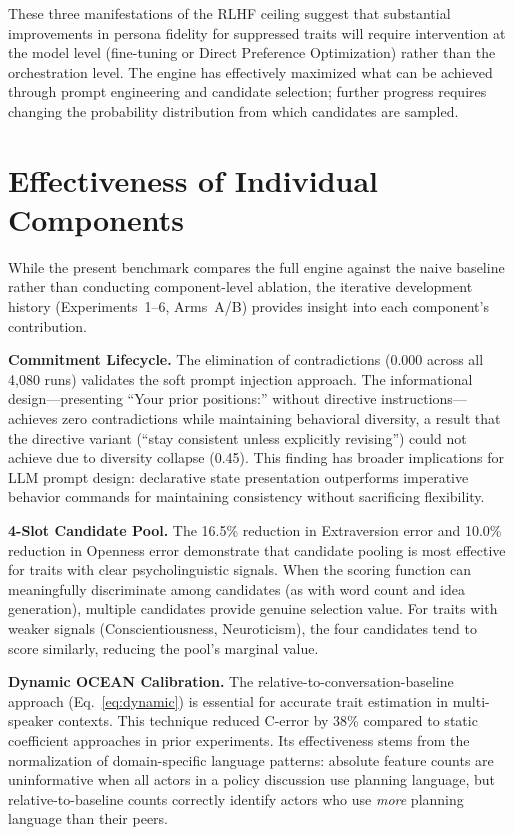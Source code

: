 These three manifestations of the RLHF ceiling suggest that substantial improvements in persona fidelity for suppressed traits will require intervention at the model level (fine-tuning or Direct Preference Optimization) rather than the orchestration level. The engine has effectively maximized what can be achieved through prompt engineering and candidate selection; further progress requires changing the probability distribution from which candidates are sampled.


\section{Effectiveness of Individual Components}

While the present benchmark compares the full engine against the naive baseline rather than conducting component-level ablation, the iterative development history (Experiments~1--6, Arms~A/B) provides insight into each component's contribution.

\textbf{Commitment Lifecycle.} The elimination of contradictions (0.000 across all 4,080 runs) validates the soft prompt injection approach. The informational design---presenting ``Your prior positions:'' without directive instructions---achieves zero contradictions while maintaining behavioral diversity, a result that the directive variant (``stay consistent unless explicitly revising'') could not achieve due to diversity collapse (0.45). This finding has broader implications for LLM prompt design: declarative state presentation outperforms imperative behavior commands for maintaining consistency without sacrificing flexibility.

\textbf{4-Slot Candidate Pool.} The 16.5\% reduction in Extraversion error and 10.0\% reduction in Openness error demonstrate that candidate pooling is most effective for traits with clear psycholinguistic signals. When the scoring function can meaningfully discriminate among candidates (as with word count and idea generation), multiple candidates provide genuine selection value. For traits with weaker signals (Conscientiousness, Neuroticism), the four candidates tend to score similarly, reducing the pool's marginal value.

\textbf{Dynamic OCEAN Calibration.} The relative-to-conversation-baseline approach (Eq.~\ref{eq:dynamic}) is essential for accurate trait estimation in multi-speaker contexts. This technique reduced C-error by 38\% compared to static coefficient approaches in prior experiments. Its effectiveness stems from the normalization of domain-specific language patterns: absolute feature counts are uninformative when all actors in a policy discussion use planning language, but relative-to-baseline counts correctly identify actors who use \textit{more} planning language than their peers.


